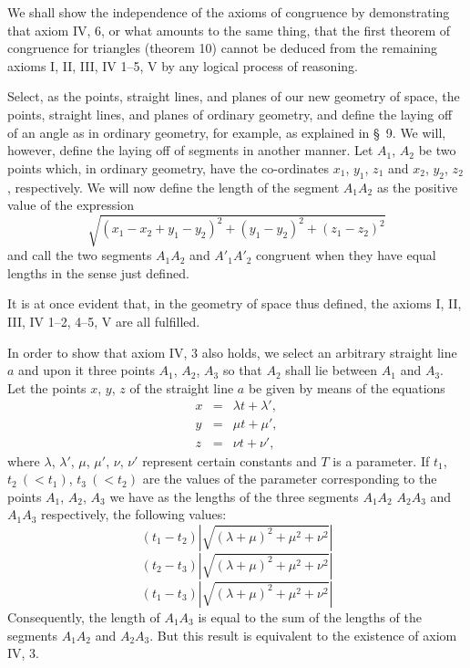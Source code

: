 \documentclass[11pt,oneside]{book}
\begin{document}
\label{p11}

We shall show the independence of the axioms of
congruence by demonstrating that axiom IV, 6, or
what amounts to the same thing, that the first theorem
of congruence for triangles (theorem 10) cannot
be deduced from the remaining axioms I, II, III, IV
1--5, V by any logical process of reasoning.

Select, as the points, straight lines, and planes of
our new geometry of space, the points, straight lines,
and planes of ordinary geometry, and define the laying
off of an angle as in ordinary geometry, for example,
as explained in \S~9. We will, however, define the laying
off of segments in another manner. Let $A_1$, $A_2$ be
two points which, in ordinary geometry, have the co-ordinates
$x_1$, $y_1$, $z_1$ and $x_2$, $y_2$, $z_2$, respectively. We
will now define the length of the segment $A_1 A_2$ as the
positive value of the expression
\[
\sqrt{(x_1-x_2+y_1-y_2)^2 + (y_1-y_2)^2 + (z_1-z_2)^2}
\]
and call the two segments $A_1A_2$ and $A'_1A'_2$ congruent
when they have equal lengths in the sense just defined.

It is at once evident that, in the geometry of space
thus defined, the axioms I, II, III, IV 1--2, 4--5, V are
all fulfilled.

In order to show that axiom IV, 3 also holds, we
select an arbitrary straight line $a$ and upon it three
points $A_1$, $A_2$, $A_3$ so that $A_2$ shall lie between $A_1$ and
$A_3$. Let the points $x$, $y$, $z$ of the straight line $a$ be
given by means of the equations
\begin{eqnarray*}
x & = & \lambda t + \lambda', \\
y & = & \mu t + \mu', \\
z & = & \nu t + \nu',
\end{eqnarray*}
where $\lambda$, $\lambda'$, $\mu$, $\mu'$, $\nu$, $\nu'$ represent certain constants and
$T$ is a parameter. If $t_1$, $t_2\ (<t_1)$, $t_3\ (<t_2)$ are the values
of the parameter corresponding to the points $A_1$, $A_2$,
$A_3$ we have as the lengths of the three segments $A_1A_2$
$A_2A_3$ and $A_1A_3$ respectively, the following values:
\[
(t_1-t_2) \left| \sqrt{(\lambda + \mu)^2 + \mu^2 + \nu^2} \right|
\]
\[
(t_2-t_3) \left| \sqrt{(\lambda + \mu)^2 + \mu^2 + \nu^2} \right|
\]
\[
(t_1-t_3) \left| \sqrt{(\lambda + \mu)^2 + \mu^2 + \nu^2} \right|
\]
Consequently, the length of $A_1A_3$ is equal to the sum of
the lengths of the segments $A_1A_2$ and $A_2A_3$. But this
result is equivalent to the existence of axiom IV, 3.
\end{document}
